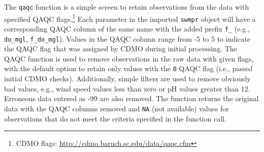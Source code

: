 \documentclass[10pt,letterpaper]{article}\usepackage[]{graphicx}\usepackage[]{color}
\begin{document}
The \texttt{qaqc} function is a simple screen to retain observations from the data with specified QAQC flags.\footnote{\ac{CDMO} flags: \url{http://cdmo.baruch.sc.edu/data/qaqc.cfm}} Each parameter in the imported \texttt{swmpr} object will have a corresponding QAQC column of the same name with the added prefix \texttt{f\_} (e.g., \texttt{do\_mgl}, \texttt{f\_do\_mgl}).  Values in the QAQC column range from -5 to 5 to indicate the \ac{QAQC} flag that was assigned by \ac{CDMO} during initial processing.  The \ac{QAQC} function is used to remove observations in the raw data with given flags, with the default option to retain only values with the \texttt{0} \ac{QAQC} flag (i.e., passed initial \ac{CDMO} checks).     Additionally, simple filters are used to remove obviously bad values, e.g., wind speed values less than zero or pH values greater than 12. Erroneous data entered as -99 are also removed. The function returns the original data with the QAQC columns removed and \texttt{NA} (not available) values for observations that do not meet the criteria specified in the function call.
\end{document}
